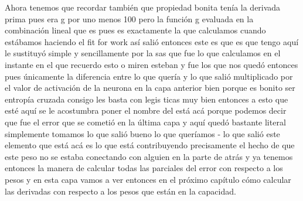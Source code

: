 Ahora tenemos que recordar también que propiedad bonita tenía la derivada prima pues era g por uno menos 100 pero la función g evaluada en la combinación lineal que es pues es exactamente la que calculamos cuando estábamos haciendo el fit for work así salió entonces este es que es que tengo aquí le sustituyó simple y sencillamente por la sas que fue lo que calculamos en el instante en el que recuerdo esto o miren esteban y fue los que nos quedó entonces pues únicamente la diferencia entre lo que quería y lo que salió multiplicado por el valor de activación de la neurona en la capa anterior bien porque es bonito ser entropía cruzada consigo les basta con legis ticas muy bien entonces a esto que esté aquí se le acostumbra poner el nombre del está acá porque podemos decir que fue el error que se cometió en la última capa y aquí quedó bastante literal simplemente tomamos lo que salió bueno lo que queríamos - lo que salió este elemento que está acá es lo que está contribuyendo precisamente el hecho de que este peso no se estaba conectando con alguien en la parte de atrás y ya tenemos entonces la manera de calcular todas las parciales del error con respecto a los pesos y en esta capa vamos a ver entonces en el próximo capítulo cómo calcular las derivadas con respecto a los pesos que están en la capacidad.
